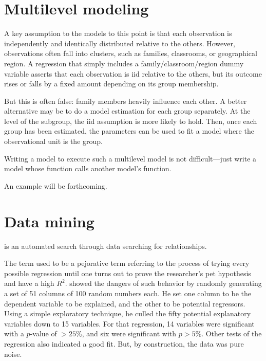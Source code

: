 
\section{Multilevel modeling} A key assumption to the models to this
point is that each observation is independently and identically distributed
relative to the others. However, observations often fall into clusters,
such as families, classrooms, or geographical region. 
A regression that simply includes a family/classroom/region dummy variable
asserts that each observation is iid relative to the others, but its
outcome rises or falls by a fixed amount depending on its group
membership.

But this is often false: family members heavily influence each other.
A better alternative may be to do a model estimation for each group
separately. At the level of the subgroup, the iid assumption is more
likely to hold. Then, once each group has been estimated, the parameters
can be used to fit a model where the observational unit is the group.

Writing a model to execute such a multilevel model is not
difficult---just write a model whose  function calls
another model's  function. 

An example will be forthcoming.


\section{Data mining}  is an automated search through
data searching for relationships. 

The term used to be a pejorative term
referring to the process of trying every possible regression until one
turns out to prove the researcher's pet hypothesis and have a high $R^2$.
\citet{freedman:screening} showed the dangers of such behavior by randomly
generating a set of 51 columns of 100 random numbers each. He set one
column to be the dependent variable to be explained, and the other to be
potential regressors. Using a simple exploratory technique, he culled
the fifty potential explanatory variables down to 15 variables. For that
regression, 14 variables were significant with a $p$-value of $> 25\%$,
and six were significant with $p > 5\%$. Other tests of the regression
also indicated a good fit. But, by construction, the data was pure noise.


